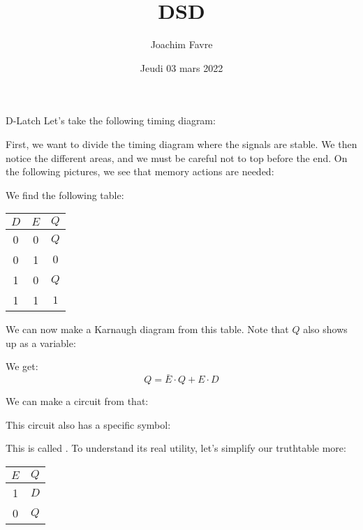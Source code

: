 \documentclass[a4paper]{article}
\title{DSD}
\author{Joachim Favre}
\date{Jeudi 03 mars 2022}
\begin{document}
\maketitle


\begin{parag}{D-Latch}
    Let's take the following timing diagram:

    First, we want to divide the timing diagram where the signals are stable. We then notice the different areas, and we must be careful not to top before the end. On the following pictures, we see that memory actions are needed:     

    We find the following table:
    \begin{center}
        \begin{tabular}{c|c|c}
            $D$ & $E$ & $Q$ \\
            \hline
            0 & 0 & $Q$ \\
            0 & 1 & $0$ \\
            1 & 0 & $Q$ \\
            1 & 1 & $1$ \\
        \end{tabular}
    \end{center}

    We can now make a Karnaugh diagram from this table. Note that $Q$ also shows up as a variable:

    We get: 
    \[Q = \bar{E} \cdot Q + E\cdot D\]
    
    We can make a circuit from that: 

    This circuit also has a specific symbol:

    This is called . To understand its real utility, let's simplify our truthtable more:
    \begin{center}
        \begin{tabular}{c|c}
            $E$ & $Q$ \\
            \hline
            1 & $D$ \\
            0 & $Q$ \\
        \end{tabular}
    \end{center}


\end{parag}
\end{document}
